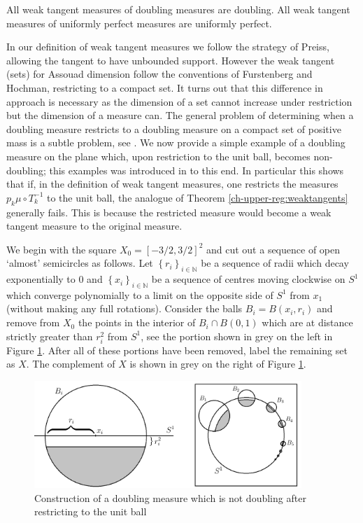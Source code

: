 \begin{corollary}
	All weak tangent measures of doubling measures are doubling. All weak tangent measures of uniformly perfect measures are uniformly perfect.
\end{corollary}



In our definition of weak tangent measures we follow the strategy of Preiss, allowing the tangent to have unbounded support. However the weak tangent (sets) for Assouad dimension follow the conventions of Furstenberg and Hochman, restricting to a compact set. It turns out that this difference in approach is necessary as the dimension of a set cannot increase under restriction but the dimension of a measure can. The general problem of determining when a doubling measure restricts to a doubling measure on a compact set of positive mass is a subtle problem, see \cite{ojala}. We now provide a simple example of a doubling measure on the plane which, upon restriction to the unit ball, becomes non-doubling; this examples was introduced in \cite{fraser-howroyd2} to this end. In particular this shows that if, in the definition of weak tangent measures, one restricts the measures $p_k \mu \circ T^{-1}_k$ to the unit ball, the analogue of Theorem \ref{ch-upper-reg:weaktangents} generally fails. This is because the restricted measure would become a weak tangent measure to the original measure.

We begin with the square $X_0 = [-3/2, 3/2]^2$ and cut out a sequence of open   `almost' semicircles as follows.   Let $\left\{r_i \right\}_{i\in \mathbb{N}}$ be a sequence of radii which decay exponentially to 0 and $\left\{x_i\right\}_{i\in \mathbb{N}}$ be a sequence of centres moving clockwise on  $S^1$ which converge polynomially to a limit on the opposite side of $S^1$ from $x_1$ (without making any full rotations). Consider the balls $B_i = B(x_i, r_i)$ and remove from $X_0$ the points in the interior of  $B_i \cap B(0,1)$ which are at distance strictly greater than $r_i^2$ from $S^1$, see the portion shown in grey on the left in Figure \ref{ch-upper-reg:example}.  After all of these portions have been removed, label the remaining set as $X$.  The complement of $X$ is shown in grey on the right of Figure \ref{ch-upper-reg:example}. 

\begin{figure}[h]
	\centering
	\includegraphics[width=0.9\textwidth]{pics/ch-upper-reg/example.png}
	\caption{Construction of a doubling measure which is not doubling after restricting to the unit ball}
	\label{ch-upper-reg:example}
\end{figure}


